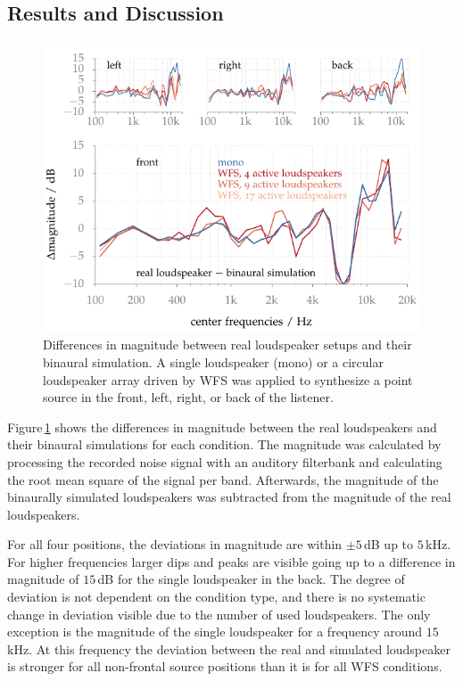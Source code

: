 \subsection{Results and Discussion}
%
\begin{figure}
    \centering
    \includegraphics{fig4_09/fig4_09}
    \caption{Differences in magnitude between real loudspeaker setups and their binaural simulation.
    A single loudspeaker (mono) or a circular loudspeaker array driven by
    \ac{WFS}
    was applied to synthesize a point source in the front, left, right, or back
    of the listener.
    }
    \label{fig:pinta_recordings}
\end{figure}
%
Figure\,\ref{fig:pinta_recordings} shows the differences in magnitude between
the real loudspeakers and their binaural simulations for each condition.
The magnitude was calculated by processing the recorded noise signal with an
auditory filterbank and calculating the root mean square of the signal per band.
Afterwards, the
magnitude of the binaurally simulated loudspeakers was subtracted from the
magnitude of the real loudspeakers.

For all four positions, the deviations in magnitude are within $\pm5$\,dB up to
$5$\,kHz. For higher frequencies larger dips and peaks are visible going up to a
difference in magnitude of $15$\,dB for the single loudspeaker in the back.
The degree of deviation is not dependent on the condition type, and there is no
systematic change in deviation visible due to the number of used loudspeakers.
The only exception is the magnitude of the single loudspeaker for a frequency
around $15$\,kHz. At this frequency the deviation between the real and simulated
loudspeaker is stronger for all non-frontal source positions
than it is for all \ac{WFS} conditions.

